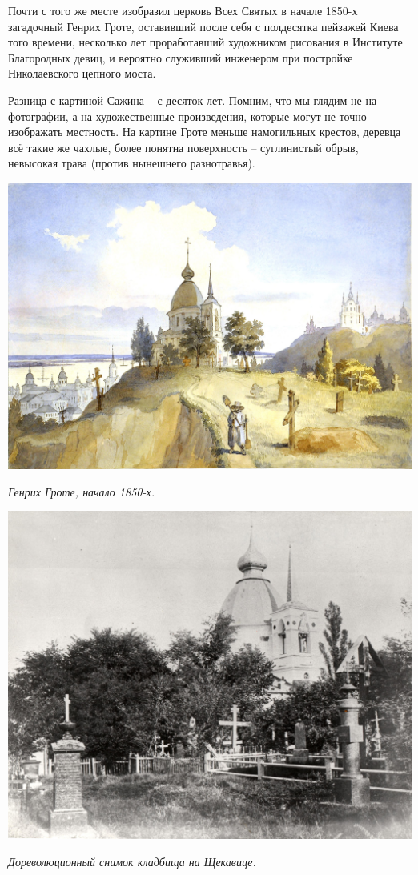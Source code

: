 Почти с того же месте изобразил церковь Всех Святых в начале 1850-х загадочный Генрих Гроте, оставивший после себя с полдесятка пейзажей Киева того времени, несколько лет проработавший художником рисования в Институте Благородных девиц, и вероятно служивший инженером при постройке Николаевского цепного моста.

Разница с картиной Сажина – с десяток лет. Помним, что мы глядим не на фотографии, а на художественные произведения, которые могут не точно изображать местность. На картине Гроте меньше намогильных крестов, деревца всё такие же чахлые, более понятна поверхность – суглинистый обрыв, невысокая трава (против нынешнего разнотравья).

\begin{center}
\includegraphics[width=\linewidth]{chast-colebanie-osnov/sheka/grote.jpg}

\textit{Генрих Гроте, начало 1850-х.}
\end{center}





\begin{center}
\includegraphics[width=0.75\linewidth]{chast-colebanie-osnov/sheka/sheka_kladb2.jpg}

\textit{Дореволюционный снимок кладбища на Щекавице.}
\end{center}


